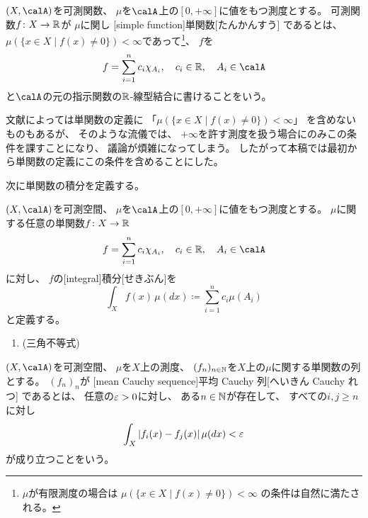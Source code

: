 \documentclass[report]{jlreq}
\begin{document}
\begin{definition}[単関数]
    $(X, \calA)$を可測関数、
    $\mu$を$\calA$上の$[0, +\infty]$に値をもつ測度とする。
    可測関数$f \colon X \to \mathbb{R}$が
    $\mu$に関し
    [simple function]{単関数}[たんかんすう]
    であるとは、
    $\mu(\{ x \in X \mid f(x) \neq 0 \}) < \infty$であって\footnote{
        $\mu$が有限測度の場合は
        $\mu(\{ x \in X \mid f(x) \neq 0 \}) < \infty$
        の条件は自然に満たされる。
    }、
    $f$を
    \begin{equation}
        f = \sum_{i = 1}^n c_i \chi_{A_i},
            \quad
            c_i \in \R,
            \quad
            A_i \in \calA
    \end{equation}
    と$\calA$の元の指示関数の$\mathbb{R}$-線型結合に書けることをいう。
\end{definition}

文献によっては単関数の定義に
「$\mu(\{ x \in X \mid f(x) \neq 0 \}) < \infty$」
を含めないものもあるが、
そのような流儀では、
$+\infty$を許す測度を扱う場合にのみこの条件を課すことになり、
議論が煩雑になってしまう。
したがって本稿では最初から単関数の定義にこの条件を含めることにした。

次に単関数の積分を定義する。

\begin{definition}[単関数の積分]
    $(X, \calA)$を可測空間、
    $\mu$を$\calA$上の$[0, +\infty]$に値をもつ測度とする。
    $\mu$に関する任意の単関数$f \colon X \to \mathbb{R}$
    \begin{equation}
        f = \sum_{i = 1}^n c_i \chi_{A_i},
            \quad
            c_i \in \R,
            \quad
            A_i \in \calA
    \end{equation}
    に対し、
    $f$の[integral]{積分}[せきぶん]を
    \begin{equation}
        \int_X f(x) \, \mu(dx)
            \coloneqq \sum_{i = 1}^n c_i \mu(A_i)
    \end{equation}
    と定義する。
\end{definition}

\begin{proposition}[単関数の積分の基本性質]
    \begin{enumerate}
        \item (三角不等式)
    \end{enumerate}
    \TODO{}
\end{proposition}

\begin{definition}
    $(X, \calA)$を可測空間、
    $\mu$を$X$上の測度、
    $(f_n)_{n \in \mathbb{N}}$を$X$上の$\mu$に関する単関数の列とする。
    $(f_n)_n$が
    [mean Cauchy sequence]{平均 Cauchy 列}[へいきん Cauchy れつ]
    であるとは、
    任意の$\varepsilon > 0$に対し、
    ある$n \in \mathbb{N}$が存在して、
    すべての$i, j \ge n$に対し
    \begin{equation}
        \int_X |f_i(x) - f_j(x)| \, \mu(dx) < \varepsilon
    \end{equation}
    が成り立つことをいう。
\end{definition}
\end{document}
